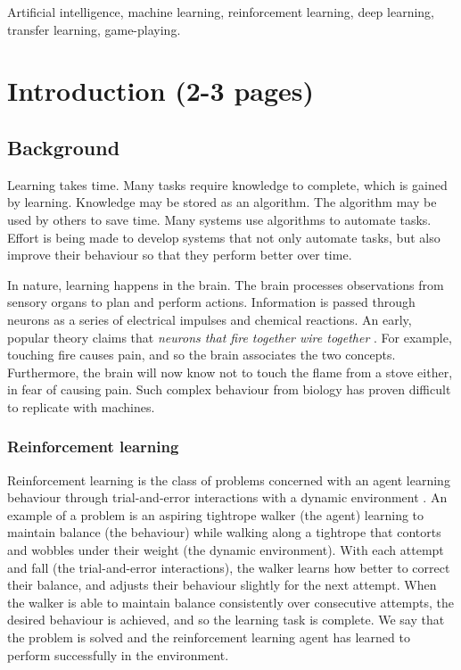 \documentclass[12pt,a4paper]{article}
\begin{document}
\begin{keywords}
Artificial intelligence, machine learning, reinforcement learning, deep learning, transfer learning, game-playing.
\end{keywords}

\newpage
\section{Introduction (2-3 pages)}
\subsection{Background} 
Learning takes time. Many tasks require knowledge to complete, which is gained by learning. Knowledge may be stored as an algorithm. The algorithm may be used by others to save time. Many systems use algorithms to automate tasks. Effort is being made to develop systems that not only automate tasks, but also improve their behaviour so that they perform better over time.

In nature, learning happens in the brain. The brain processes observations from sensory organs to plan and perform actions. Information is passed through neurons as a series of electrical impulses and chemical reactions. An early, popular theory claims that \textit{neurons that fire together wire together} \cite{}. For example, touching fire causes pain, and so the brain associates the two concepts. Furthermore, the brain will now know not to touch the flame from a stove either, in fear of causing pain. Such complex behaviour from biology has proven difficult to replicate with machines.    

\subsubsection{Reinforcement learning}
Reinforcement learning is the class of problems concerned with an agent learning behaviour through trial-and-error interactions with a dynamic environment \cite{Kaelbling1996}. An example of a problem is an aspiring tightrope walker (the agent) learning to maintain balance (the behaviour) while walking along a tightrope that contorts and wobbles under their weight (the dynamic environment). With each attempt and fall (the trial-and-error interactions), the walker learns how better to correct their balance, and adjusts their behaviour slightly for the next attempt. When the walker is able to maintain balance consistently over consecutive attempts, the desired behaviour is achieved, and so the learning task is complete. We say that the problem is solved and the reinforcement learning agent has learned to perform successfully in the environment.  
\end{document}
